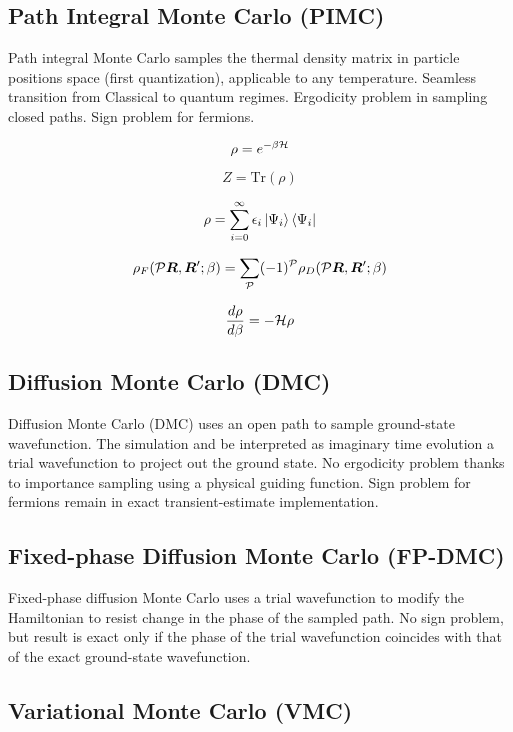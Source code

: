 \subsection{Path Integral Monte Carlo (PIMC)}
Path integral Monte Carlo samples the thermal density matrix in particle positions space (first quantization), applicable to any temperature. Seamless transition from Classical to quantum regimes. Ergodicity problem in sampling closed paths. Sign problem for fermions.

\begin{equation}
\rho = e^{-\beta \mathcal{H}}
\end{equation}

\begin{equation}
Z = \text{Tr} \left( \rho \right)
\end{equation}

\begin{equation}
\rho = \sum\limits_{i=0}^\infty \epsilon_i \ket{\Psi_i}\bra{\Psi_i} 
\end{equation}

\begin{equation}
\rho_F(\mathcal{P}\boldsymbol{R}, \boldsymbol{R}'; \beta) = \sum\limits_{\mathcal{P}} (-1)^{\mathcal{P}} \rho_D (\mathcal{P}\boldsymbol{R}, \boldsymbol{R}'; \beta)
\end{equation}

\begin{equation}
\dfrac{d\rho}{d\beta} = -\mathcal{H} \rho
\end{equation}

\subsection{Diffusion Monte Carlo (DMC)}
Diffusion Monte Carlo (DMC) uses an open path to sample ground-state wavefunction. The simulation and be interpreted as imaginary time evolution a trial wavefunction to project out the ground state. No ergodicity problem thanks to importance sampling using a physical guiding function. Sign problem for fermions remain in exact transient-estimate implementation.

\subsection{Fixed-phase Diffusion Monte Carlo (FP-DMC)}
Fixed-phase diffusion Monte Carlo uses a trial wavefunction to modify the Hamiltonian to resist change in the phase of the sampled path. No sign problem, but result is exact only if the phase of the trial wavefunction coincides with that of the exact ground-state wavefunction.

\subsection{Variational Monte Carlo (VMC)}

